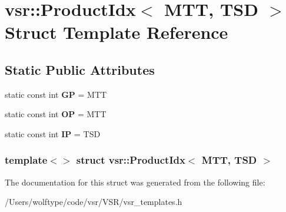 \hypertarget{structvsr_1_1_product_idx_3_01_m_t_t_00_01_t_s_d_01_4}{\section{vsr\-:\-:Product\-Idx$<$ M\-T\-T, T\-S\-D $>$ Struct Template Reference}
\label{structvsr_1_1_product_idx_3_01_m_t_t_00_01_t_s_d_01_4}
}
\subsection*{Static Public Attributes}
\begin{DoxyCompactItemize}
\item 
\hypertarget{structvsr_1_1_product_idx_3_01_m_t_t_00_01_t_s_d_01_4_a9013bee7e0934c8e7fb84e2765dc2556}{static const int {\bfseries G\-P} = M\-T\-T}\label{structvsr_1_1_product_idx_3_01_m_t_t_00_01_t_s_d_01_4_a9013bee7e0934c8e7fb84e2765dc2556}

\item 
\hypertarget{structvsr_1_1_product_idx_3_01_m_t_t_00_01_t_s_d_01_4_ab7eb71c3b3498bff82dc57862524a841}{static const int {\bfseries O\-P} = M\-T\-T}\label{structvsr_1_1_product_idx_3_01_m_t_t_00_01_t_s_d_01_4_ab7eb71c3b3498bff82dc57862524a841}

\item 
\hypertarget{structvsr_1_1_product_idx_3_01_m_t_t_00_01_t_s_d_01_4_a1da7f24c8e0b1363b78b6a9d9fe83b8a}{static const int {\bfseries I\-P} = T\-S\-D}\label{structvsr_1_1_product_idx_3_01_m_t_t_00_01_t_s_d_01_4_a1da7f24c8e0b1363b78b6a9d9fe83b8a}

\end{DoxyCompactItemize}
\subsubsection*{template$<$$>$ struct vsr\-::\-Product\-Idx$<$ M\-T\-T, T\-S\-D $>$}



The documentation for this struct was generated from the following file\-:\begin{DoxyCompactItemize}
\item 
/\-Users/wolftype/code/vsr/\-V\-S\-R/vsr\-\_\-templates.\-h\end{DoxyCompactItemize}
